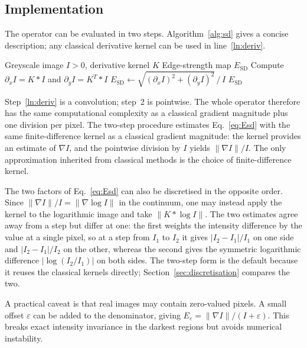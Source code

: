 \documentclass[conference]{IEEEtran}
\begin{document}
\subsection{Implementation}
The operator can be evaluated in two steps.  Algorithm~\ref{alg:sd} gives
a concise description; any classical derivative kernel can be used in
line~\ref{ln:deriv}.

\begin{algorithm}[H]
\caption{Isotropic relative-gradient edge-strength map (implements
Eq.~\eqref{eq:Esd}, not the radial score $L$ of Eq.~\eqref{eq:L2}).}
\label{alg:sd}
\begin{algorithmic}[1]
\REQUIRE Greyscale image $I>0$, derivative kernel $K$
\ENSURE Edge-strength map $E_{\mathrm{SD}}$
\STATE Compute $\partial_x I = K * I$ and $\partial_y I = K^T * I$
        \label{ln:deriv}
\STATE $E_{\mathrm{SD}} \leftarrow \sqrt{(\partial_x I)^2+(\partial_y I)^2}\,/\,I$
\RETURN $E_{\mathrm{SD}}$
\end{algorithmic}
\end{algorithm}

Step~\ref{ln:deriv} is a convolution; step~2 is pointwise.  The whole
operator therefore has the same computational complexity as a classical
gradient magnitude plus one division per pixel.  The two-step procedure estimates
Eq.~\eqref{eq:Esd} with the same finite-difference kernel as a classical
gradient magnitude: the kernel provides an estimate of $\nabla I$, and the
pointwise division by $I$ yields $\|\nabla I\|/I$.  The only approximation
inherited from classical methods is the choice of finite-difference kernel.

The two factors of Eq.~\eqref{eq:Esd} can also be discretised in the opposite
order.  Since $\|\nabla I\|/I=\|\nabla\log I\|$ in the continuum, one may instead
apply the kernel to the logarithmic image and take $\|K*\log I\|$.  The two
estimates agree away from a step but differ at one: the first weights the
intensity difference by the value at a single pixel, so at a step from $I_1$ to
$I_2$ it gives $|I_2-I_1|/I_1$ on one side and $|I_2-I_1|/I_2$ on the other,
whereas the second gives the symmetric logarithmic difference
$|\log(I_2/I_1)|$ on both sides.  The two-step form is the default because it
reuses the classical kernels directly; Section~\ref{sec:discretisation} compares
the two.

A practical caveat is that real images may contain zero-valued pixels.  A
small offset $\varepsilon$ can be added to the denominator, giving
$E_{\varepsilon}=\|\nabla I\|/(I+\varepsilon)$.  This breaks exact intensity
invariance in the darkest regions but avoids numerical instability.
\end{document}
